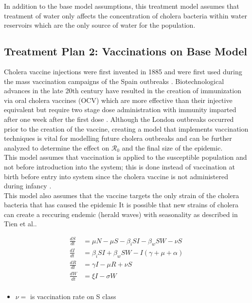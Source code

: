 \documentclass[12pt]{article}\usepackage[]{graphicx}\usepackage[]{color}
\begin{document}
In addition to the base model assumptions, this treatment model assumes that treatment of water only affects the concentration of cholera bacteria within water reservoirs which are the only source of water for the population.

\subsection{Treatment Plan 2: Vaccinations on Base Model}
Cholera vaccine injections were first invented in 1885 and were first used during the mass vaccination campaigns of the Spain outbreaks \citep{link21}.
Biotechnological advances in the late 20th century have resulted in the creation of immunization via oral cholera vaccines (OCV) which are more effective than their injective equivalent but require two stage dose administration with immunity imparted after one week after the first dose \citep{link21} \citep{link25}.
Although the London outbreaks occurred prior to the creation of the vaccine, creating a model that implements vaccination techniques is vital for modelling future cholera outbreaks and can be further analyzed to determine the effect on $\mathcal R_0$ and the final size of the epidemic.\\
This model assumes that vaccination is applied to the susceptible population and not before introduction into the system; this is done instead of vaccination at birth before entry into system since the cholera vaccine is not administered during infancy \citep{link25}.\\
This model also assumes that the vaccine targets the only strain of the cholera bacteria that has caused the epidemic %
It is possible that new strains of cholera can create a reccuring endemic (herald waves) with seasonality as described in Tien et al.\citep{link3}.

\begin{align*}
	\frac{dS}{dt}&= \mu N - \mu S - \beta_i SI - \beta_w S W - \nu S \\
	\frac{dI}{dt}&= \beta_i S I + \beta_w S W - I (\gamma + \mu + \alpha) \\
	\frac{dR}{dt}&= \gamma I - \mu R + \nu S\\
	\frac{dW}{dt}&= \xi I  - \sigma W\\
\end{align*}

\begin{itemize}
	\item $\nu=$ is vaccination rate on S class
\end{itemize}
\end{document}
